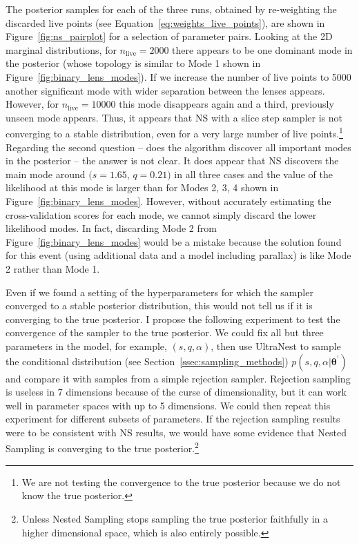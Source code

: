 \documentclass[12pt,dvipsnames]{report}
\newcommand{\ssf}[1]{\textsf{#1}}
\renewcommand{\vec}[1]{\boldsymbol{\mathbf{#1}}}
\begin{document}
The posterior samples for each of the three runs, obtained by re-weighting the discarded
live points (see Equation~\ref{eq:weights_live_points}), are shown in 
Figure~\ref{fig:ns_pairplot} for a selection of parameter pairs. Looking at the 2D marginal 
distributions, for $n_\mathrm{live}=2000$ there appears to be one dominant mode in the 
posterior (whose topology is similar to Mode 1 shown in Figure~\ref{fig:binary_lens_modes}).
If we increase the number of live points to 5000 another significant mode with wider separation
between the lenses appears. However, for $n_\mathrm{live}=10000$ this mode disappears again 
and a third, previously unseen mode appears. Thus, it appears that NS with a slice step sampler 
is not converging to a stable distribution, even for a very large number of live points.\footnote{We are not testing the convergence 
to the true posterior because we do not know the true posterior.}
Regarding the second question -- does the algorithm discover all important modes in the
posterior -- the answer is not clear. It does appear that NS discovers the main mode around 
$(s=1.65$, $q=0.21)$ in all three cases and the value of the likelihood 
at this mode is larger than for Modes 2, 3, 4  shown in Figure~\ref{fig:binary_lens_modes}.
However, without accurately estimating the cross-validation scores for each mode, we 
cannot simply discard the lower likelihood modes. In fact, discarding Mode 2 from 
Figure~\ref{fig:binary_lens_modes} would be a mistake because the solution 
 \citet{2018ApJ...867..136H} found for this event (using additional data and a model 
 including parallax) is like Mode 2 rather than Mode 1.


Even if we found a setting of the hyperparameters for which the sampler converged to a 
stable posterior distribution, this would not tell us if it is converging to the true posterior. 
I propose the following experiment to test the convergence of the sampler to the true posterior.
We could fix all but three parameters in the model, for example, $(s, q, \alpha)$, 
then use \ssf{UltraNest} to sample the conditional distribution 
(see Section~\ref{ssec:sampling_methods}) 
$p(s,q,\alpha|\vec\theta^\prime)$ and compare it with samples from a simple rejection 
sampler. Rejection sampling is useless in 7 dimensions because of the curse of dimensionality,
but it can work well in parameter spaces with up to 5 dimensions. We could then repeat this
experiment for different subsets of parameters. If the rejection sampling results were to be  
consistent with NS results, we would have some evidence that Nested Sampling 
is converging to the true posterior.\footnote{Unless Nested Sampling stops sampling the true posterior
faithfully in a higher dimensional space, which is also entirely possible.}
\end{document}
